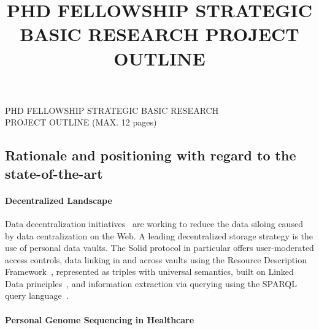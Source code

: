 \documentclass[a4paper,11pt]{article}
\begin{document}
\begin{mdframed}[backgroundcolor=black!17,linecolor=black!0,font=\bfseries]
	\centering
	PHD FELLOWSHIP STRATEGIC BASIC RESEARCH\\
	PROJECT OUTLINE (MAX. 12 pages)\\
	\end{mdframed}
	\vspace{-.5\baselineskip}
\title{PHD FELLOWSHIP STRATEGIC BASIC RESEARCH PROJECT OUTLINE}

\begin{refsection}

\section{Rationale and positioning with regard to the state-of-the-art}

\smallskip

\paragraph{Decentralized Landscape}
Data decentralization initiatives~\cite{solid, mastodon, decentralizednanopubs} are working to reduce the data siloing caused by data centralization on the Web.
A leading decentralized storage strategy is the use of personal data vaults.
The Solid protocol in particular offers user-moderated access controls, data linking in and across vaults using the Resource Description Framework~\cite{spec:rdf}, represented as triples with universal semantics, built on Linked Data principles~\cite{linkeddata}, and information extraction via querying using the SPARQL query language~\cite{spec:sparqllang}.




\paragraph{Personal Genome Sequencing in Healthcare}


\end{refsection}
\end{document}
